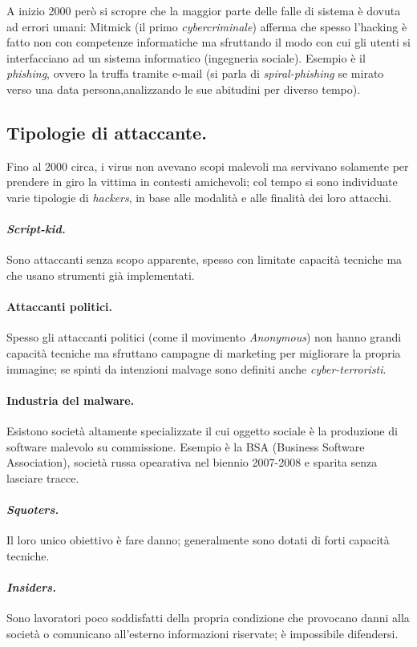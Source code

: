 \documentclass[a4page, 11pt, twocolumn]{article}
\begin{document}
A inizio 2000 però si scropre che la maggior parte delle falle di sistema è dovuta ad errori umani: Mitmick (il primo \textit{cybercriminale}) afferma che spesso l'hacking è fatto non con competenze informatiche ma sfruttando il modo con cui gli utenti si interfacciano ad un sistema informatico (ingegneria sociale).
Esempio è il \textit{phishing}, ovvero la truffa tramite e-mail (si parla di \textit{spiral-phishing} se mirato verso una data persona,analizzando le sue abitudini per diverso tempo). \newline

\subsection{Tipologie di attaccante.}
Fino al 2000 circa, i virus non avevano scopi malevoli ma servivano solamente per prendere in giro la vittima in contesti amichevoli; col tempo si sono individuate varie tipologie di \textit{hackers}, in base alle modalità e alle finalità dei loro attacchi.

\paragraph{\textit{Script-kid.}} Sono attaccanti senza scopo apparente, spesso con limitate capacità tecniche ma che usano strumenti già implementati.
\paragraph{Attaccanti politici.} Spesso gli attaccanti politici (come il movimento \textit{Anonymous}) non hanno grandi capacità tecniche ma sfruttano campagne di marketing per migliorare la propria immagine; se spinti da intenzioni malvage sono definiti anche \textit{cyber-terroristi}.
\paragraph{Industria del malware.} Esistono società altamente specializzate il cui oggetto sociale è la produzione di software malevolo su commissione.
Esempio è la BSA (Business Software Association), società russa opearativa nel biennio 2007-2008 e sparita senza lasciare tracce.
\paragraph{\textit{Squoters.}} Il loro unico obiettivo è fare danno; generalmente sono dotati di forti capacità tecniche.
\paragraph{\textit{Insiders.}} Sono lavoratori poco soddisfatti della propria condizione che provocano danni alla società o comunicano all'esterno informazioni riservate; è impossibile difendersi.
\end{document}
